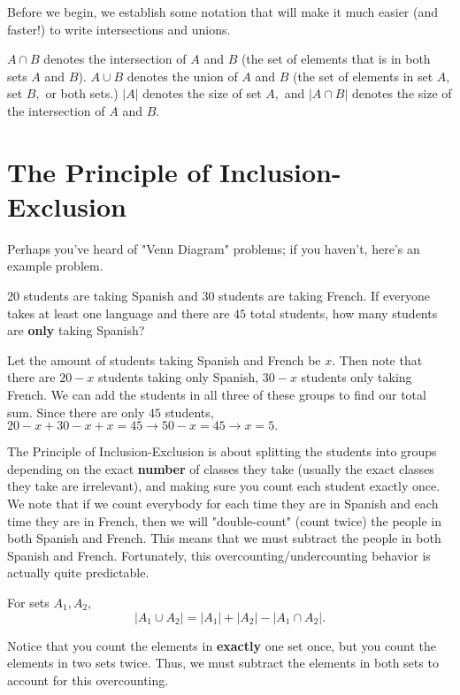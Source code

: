 Before we begin, we establish some notation that will make it much easier (and faster!) to write intersections and unions.

$A\cap B$ denotes the intersection of $A$ and $B$ (the set of elements that is in both sets $A$ and $B$). $A\cup B$ denotes the union of $A$ and $B$ (the set of elements in set $A,$ set $B,$ or both sets.) $|A|$ denotes the size of set $A,$ and $|A\cap B|$ denotes the size of the intersection of $A$ and $B.$

\section{The Principle of Inclusion-Exclusion}

Perhaps you've heard of "Venn Diagram" problems; if you haven't, here's an example problem.

\begin{exam}
$20$ students are taking Spanish and $30$ students are taking French. If everyone takes at least one language and there are $45$ total students, how many students are \textbf{only} taking Spanish?
\end{exam}

\begin{sol}
Let the amount of students taking Spanish and French be $x.$ Then note that there are $20-x$ students taking only Spanish, $30-x$ students only taking French. We can add the students in all three of these groups to find our total sum. Since there are only $45$ students, $20-x+30-x+x=45\to 50-x=45\to x=5.$
\end{sol}

The Principle of Inclusion-Exclusion is about splitting the students into groups depending on the exact \textbf{number} of classes they take (usually the exact classes they take are irrelevant), and making sure you count each student exactly once. We note that if we count everybody for each time they are in Spanish and each time they are in French, then we will "double-count" (count twice) the people in both Spanish and French. This means that we must subtract the people in both Spanish and French. Fortunately, this overcounting/undercounting behavior is actually quite predictable.

\begin{theo}
For sets $A_1,A_2,$
\[|A_1\cup A_2|=|A_1|+|A_2|-|A_1\cap A_2|.\]
\end{theo}

\begin{pro}
Notice that you count the elements in \textbf{exactly} one set once, but you count the elements in two sets twice. Thus, we must subtract the elements in both sets to account for this overcounting.
\end{pro}

